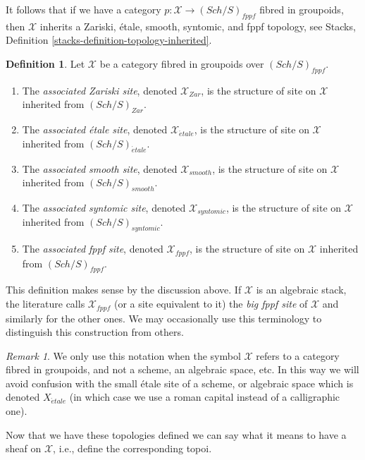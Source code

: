 \documentclass{stacks-project}
\theoremstyle{plain}
\theoremstyle{definition}
\newtheorem{definition}[subsection]{Definition}
\theoremstyle{remark}
\newtheorem{remark}[subsection]{Remark}
\numberwithin{equation}{subsection}
\def\Sch{\mathit{Sch}}
\def\etale{{\acute{e}tale}}
\begin{document}
\medskip\noindent
It follows that if we have a category
$p : \mathcal{X} \to (\Sch/S)_{fppf}$ fibred in groupoids, then
$\mathcal{X}$ inherits a Zariski, \'etale, smooth, syntomic, and
fppf topology, see
Stacks, Definition \ref{stacks-definition-topology-inherited}.

\begin{definition}
\label{definition-inherited-topologies}
Let $\mathcal{X}$ be a category fibred in groupoids over
$(\Sch/S)_{fppf}$.
\begin{enumerate}
\item The {\it associated Zariski site}, denoted $\mathcal{X}_{Zar}$,
is the structure of site on $\mathcal{X}$ inherited from
$(\Sch/S)_{Zar}$.
\item The {\it associated \'etale site}, denoted $\mathcal{X}_\etale$,
is the structure of site on $\mathcal{X}$ inherited from
$(\Sch/S)_\etale$.
\item The {\it associated smooth site}, denoted $\mathcal{X}_{smooth}$,
is the structure of site on $\mathcal{X}$ inherited from
$(\Sch/S)_{smooth}$.
\item The {\it associated syntomic site}, denoted $\mathcal{X}_{syntomic}$,
is the structure of site on $\mathcal{X}$ inherited from
$(\Sch/S)_{syntomic}$.
\item The {\it associated fppf site}, denoted $\mathcal{X}_{fppf}$,
is the structure of site on $\mathcal{X}$ inherited from
$(\Sch/S)_{fppf}$.
\end{enumerate}
\end{definition}

\noindent
This definition makes sense by the discussion above. If $\mathcal{X}$
is an algebraic stack, the literature calls $\mathcal{X}_{fppf}$ (or a
site equivalent to it) the {\it big fppf site} of $\mathcal{X}$ and similarly
for the other ones. We may occasionally use this terminology to
distinguish this construction from others.

\begin{remark}
\label{remark-ambiguity}
We only use this notation when the symbol $\mathcal{X}$ refers to a
category fibred in groupoids, and not a scheme, an algebraic space, etc.
In this way we will avoid confusion with the small \'etale site of a
scheme, or algebraic space which is denoted $X_\etale$ (in which
case we use a roman capital instead of a calligraphic one).
\end{remark}

\noindent
Now that we have these topologies defined we can say what it means
to have a sheaf on $\mathcal{X}$, i.e., define the corresponding topoi.
\end{document}
